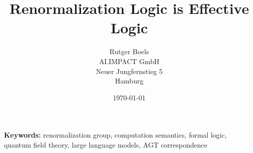 \documentclass[11pt,a4paper]{article}
\title{Renormalization Logic is Effective Logic}
\author{Rutger Boels\\AI.IMPACT GmbH\\Neuer Jungfernstieg 5\\Hamburg}
\date{\today}
\theoremstyle{definition}
\begin{document}
\maketitle



\textbf{Keywords:} renormalization group, computation semantics, formal logic, quantum field theory, large language models, AGT correspondence

\tableofcontents
\newpage
























\end{document}

